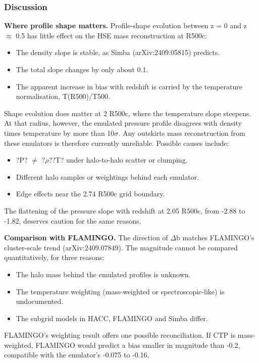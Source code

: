 \documentclass[11pt,a4paper]{article}
\begin{document}
\subsubsection*{Discussion}
\textbf{Where profile shape matters.} Profile-shape evolution between z = 0 and z $\approx$ 0.5 has little effect on the HSE mass reconstruction at R500c:

\begin{itemize}
  \item The density slope is stable, as Simba (arXiv:2409.05815) predicts.
  \item The total slope changes by only about 0.1.
  \item The apparent increase in bias with redshift is carried by the temperature normalisation, T(R500)/T500.
\end{itemize}
Shape evolution does matter at 2 R500c, where the temperature slope steepens. At that radius, however, the emulated pressure profile disagrees with density times temperature by more than 10$\sigma$. Any outskirts mass reconstruction from these emulators is therefore currently unreliable. Possible causes include:

\begin{itemize}
  \item ?P? $\neq$ ?$\rho$??T? under halo-to-halo scatter or clumping.
  \item Different halo samples or weightings behind each emulator.
  \item Edge effects near the 2.74 R500c grid boundary.
\end{itemize}
The flattening of the pressure slope with redshift at 2.05 R500c, from -2.88 to -1.82, deserves caution for the same reasons.

\textbf{Comparison with FLAMINGO.} The direction of $\Delta$b matches FLAMINGO's cluster-scale trend (arXiv:2409.07849). The magnitude cannot be compared quantitatively, for three reasons:

\begin{itemize}
  \item The halo mass behind the emulated profiles is unknown.
  \item The temperature weighting (mass-weighted or spectroscopic-like) is undocumented.
  \item The subgrid models in HACC, FLAMINGO and Simba differ.
\end{itemize}
FLAMINGO's weighting result offers one possible reconciliation. If CTP is mass-weighted, FLAMINGO would predict a bias smaller in magnitude than -0.2, compatible with the emulator's -0.075 to -0.16.
\end{document}
